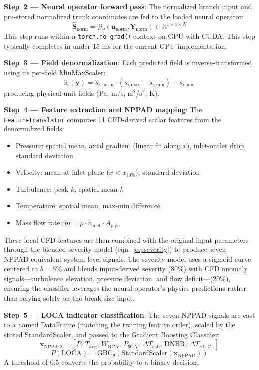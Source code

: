 \documentclass[conference]{IEEEtran}
\begin{document}
\textbf{Step~2 --- Neural operator forward pass}: The normalized branch input and pre-stored normalized trunk coordinates are fed to the loaded neural operator:
\begin{equation}
\hat{\bm{S}}_\text{norm} = \mathcal{G}_\theta(\bm{u}_\text{norm}, \bm{Y}_\text{norm}) \in \mathbb{R}^{1 \times 4 \times N}
\end{equation}
This step runs within a \texttt{torch.no\_grad()} context on GPU with CUDA. This step typically completes in under 15 ms for the current GPU implementation.

\textbf{Step~3 --- Field denormalization}: Each predicted field is inverse-transformed using its per-field MinMaxScaler:
\begin{equation}
\hat{s}_i(\bm{y}) = \hat{s}_{i,\text{norm}} \cdot (s_{i,\text{max}} - s_{i,\text{min}}) + s_{i,\text{min}}
\end{equation}
producing physical-unit fields (Pa, m/s, m$^2$/s$^2$, K).

\textbf{Step~4 --- Feature extraction and NPPAD mapping}: The \texttt{FeatureTranslator} computes 11 CFD-derived scalar features from the denormalized fields:
\begin{itemize}
    \item Pressure: spatial mean, axial gradient (linear fit along $x$), inlet-outlet drop, standard deviation
    \item Velocity: mean at inlet plane ($x < x_{10\%}$), standard deviation
    \item Turbulence: peak $k$, spatial mean $k$
    \item Temperature: spatial mean, max-min difference
    \item Mass flow rate: $\dot{m} = \rho \cdot \bar{v}_\text{inlet} \cdot A_\text{pipe}$
\end{itemize}

These local CFD features are then combined with the original input parameters through the blended severity model (eqn.~\ref{eq:severity}) to produce seven NPPAD-equivalent system-level signals. The severity model uses a sigmoid curve centered at $b = 5\%$ and blends input-derived severity (80\%) with CFD anomaly signals---turbulence elevation, pressure deviation, and flow deficit---(20\%), ensuring the classifier leverages the neural operator's physics predictions rather than relying solely on the break size input.

\textbf{Step~5 --- LOCA indicator classification}: The seven NPPAD signals are cast to a named DataFrame (matching the training feature order), scaled by the stored StandardScaler, and passed to the Gradient Boosting Classifier:
\begin{equation}
\bm{x}_{\text{NPPAD}} =
\left[
P,\,
T_{\text{avg}},\,
W_{\text{RCA}},\,
P_{\text{SGA}},\,
\Delta T_{\text{sub}},\,
\mathrm{DNBR},\,
\Delta T_{\text{HL-CL}}
\right]
\end{equation}
\begin{equation}
P(\mathrm{LOCA}) =
\mathrm{GBC}_{\theta}\!\left(
\mathrm{StandardScaler}\!\left(\bm{x}_{\text{NPPAD}}\right)
\right)
\end{equation}
A threshold of 0.5 converts the probability to a binary decision.
\end{document}
